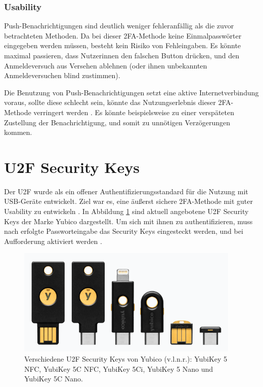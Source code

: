 \subsubsection{Usability}

Push-Benachrichtigungen sind deutlich weniger fehleranfällig als die zuvor betrachteten Methoden. Da bei dieser \ac{2FA}-Methode keine Einmalpasswörter eingegeben werden müssen, besteht kein Risiko von Fehleingaben. Es könnte maximal passieren, dass Nutzerinnen den falschen Button drücken, und den Anmeldeversuch aus Versehen ablehnen (oder ihnen unbekannten Anmeldeversuchen blind zustimmen).

Die Benutzung von Push-Benachrichtigungen setzt eine aktive Internetverbindung voraus, sollte diese schlecht sein, könnte das Nutzungserlebnis dieser \ac{2FA}-Methode verringert werden \parencite{reeseUsabilityStudy2019}. Es könnte beispielsweise zu einer verspäteten Zustellung der Benachrichtigung, und somit zu unnötigen Verzögerungen kommen.

\section{U2F Security Keys}

Der \ac{U2F} wurde als ein offener Authentifizierungsstandard für die Nutzung mit USB-Geräte entwickelt. Ziel war es, eine äußerst sichere \ac{2FA}-Methode mit guter Usability zu entwickeln \parencite{langSecurityKeys2017}. In Abbildung \ref{fig:yubikey} sind aktuell angebotene \ac{U2F} Security Keys der Marke Yubico dargestellt. Um sich mit ihnen zu authentifizieren, muss nach erfolgte Passworteingabe das Security Keys eingesteckt werden, und bei Aufforderung aktiviert werden \parencite{reeseUsabilityStudy2019}.

\begin{figure}
  \begin{center}
    \includegraphics[width=0.95\textwidth]{assets/yubikey-5.png}
  \end{center}
  \caption[Verschiedene U2F Security Keys von Yubico.]{Verschiedene U2F Security Keys von Yubico (v.l.n.r.): YubiKey 5 NFC, YubiKey 5C NFC, YubiKey 5Ci, YubiKey 5 Nano und YubiKey 5C Nano.\\\parencite{yubicoYubiKeySeries2024}}
  \label{fig:yubikey}
\end{figure}

